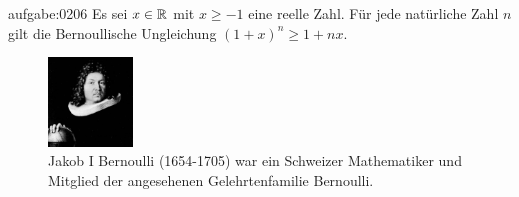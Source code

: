 \begin{aufgabe}{aufgabe:0206}
Es sei $x\in\mathbb{R}$ mit $x\geq -1$ eine reelle Zahl. Für jede natürliche Zahl $n$ gilt die Bernoullische Ungleichung $(1+x)^n\geq 1+nx$.
\begin{figure}[H]
    \centering
    \includegraphics[width=0.20\textwidth]{Bernoulli.jpg}
    \caption{Jakob I Bernoulli (1654-1705) war ein Schweizer Mathematiker und Mitglied der angesehenen Gelehrtenfamilie Bernoulli.}
    \label{fig:Bernoulli}
\end{figure}
\end{aufgabe}
